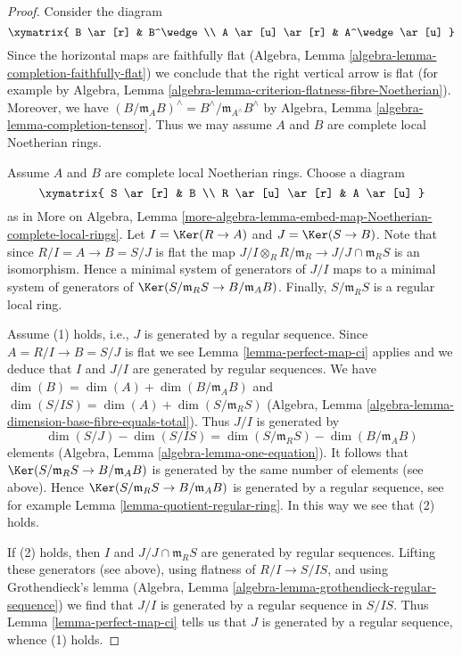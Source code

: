 \begin{proof}
Consider the diagram
$$
\xymatrix{
B \ar[r] & B^\wedge \\
A \ar[u] \ar[r] & A^\wedge \ar[u]
}
$$
Since the horizontal maps are faithfully flat
(Algebra, Lemma \ref{algebra-lemma-completion-faithfully-flat})
we conclude that the right vertical arrow is flat
(for example by Algebra, Lemma
\ref{algebra-lemma-criterion-flatness-fibre-Noetherian}).
Moreover, we have
$(B/\mathfrak m_A B)^\wedge = B^\wedge/\mathfrak m_{A^\wedge} B^\wedge$
by Algebra, Lemma \ref{algebra-lemma-completion-tensor}.
Thus we may assume $A$ and $B$ are complete local Noetherian rings.

\medskip\noindent
Assume $A$ and $B$ are complete local Noetherian rings.
Choose a diagram
$$
\xymatrix{
S \ar[r] & B \\
R \ar[u] \ar[r] & A \ar[u]
}
$$
as in More on Algebra, Lemma
\ref{more-algebra-lemma-embed-map-Noetherian-complete-local-rings}.
Let $I = \Ker(R \to A)$ and $J = \Ker(S \to B)$.
Note that since $R/I = A \to B = S/J$ is flat the map
$J/I \otimes_R R/\mathfrak m_R \to J/J \cap \mathfrak m_R S$
is an isomorphism. Hence a minimal system of generators of $J/I$
maps to a minimal system of generators of
$\Ker(S/\mathfrak m_R S \to B/\mathfrak m_A B)$.
Finally, $S/\mathfrak m_R S$ is a regular local ring.

\medskip\noindent
Assume (1) holds, i.e., $J$ is generated by a regular sequence.
Since $A = R/I \to B = S/J$ is flat we see
Lemma \ref{lemma-perfect-map-ci} applies and we deduce
that $I$ and $J/I$ are generated by regular sequences.
We have $\dim(B) = \dim(A) + \dim(B/\mathfrak m_A B)$ and
$\dim(S/IS) = \dim(A) + \dim(S/\mathfrak m_R S)$
(Algebra, Lemma \ref{algebra-lemma-dimension-base-fibre-equals-total}).
Thus $J/I$ is generated by
$$
\dim(S/J) - \dim(S/IS) = \dim(S/\mathfrak m_R S) - \dim(B/\mathfrak m_A B)
$$
elements (Algebra, Lemma \ref{algebra-lemma-one-equation}).
It follows that $\Ker(S/\mathfrak m_R S \to B/\mathfrak m_A B)$
is generated by the same number of elements (see above).
Hence $\Ker(S/\mathfrak m_R S \to B/\mathfrak m_A B)$
is generated by a regular sequence, see for example
Lemma \ref{lemma-quotient-regular-ring}.
In this way we see that (2) holds.

\medskip\noindent
If (2) holds, then $I$ and $J/J \cap \mathfrak m_RS$
are generated by regular sequences. Lifting these generators
(see above), using flatness of $R/I \to S/IS$,
and using Grothendieck's lemma
(Algebra, Lemma \ref{algebra-lemma-grothendieck-regular-sequence})
we find that $J/I$ is generated by a regular sequence in $S/IS$.
Thus Lemma \ref{lemma-perfect-map-ci} tells us that $J$
is generated by a regular sequence, whence (1) holds.
\end{proof}

